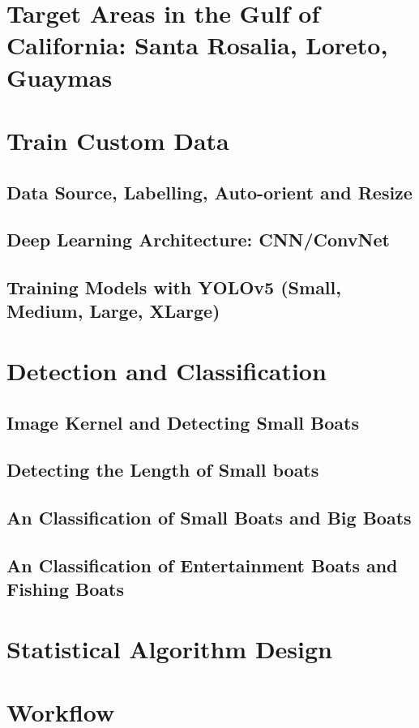 \section{Target Areas in the Gulf of California: Santa Rosalia, Loreto, Guaymas}


\section{Train Custom Data}
\subsection{Data Source, Labelling, Auto-orient and Resize}
\subsection{Deep Learning Architecture: CNN/ConvNet}
\subsection{Training Models with YOLOv5 (Small, Medium, Large, XLarge)}


\section{Detection and Classification}
\subsection{Image Kernel and Detecting Small Boats}
\subsection{Detecting the Length of Small boats}
\subsection{An Classification of Small Boats and Big Boats}
\subsection{An Classification of Entertainment Boats and Fishing Boats}

\section{Statistical Algorithm Design}

\section{Workflow}